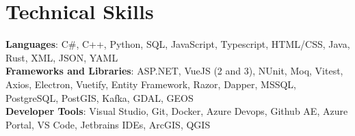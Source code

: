 \documentclass[letterpaper,11pt]{article}
\begin{document}
\section{Technical Skills}
\begin{itemize}[leftmargin=0.15in, label={}]
   \small{\item{
    \textbf{Languages}{: C\#, C++, Python, SQL, JavaScript, Typescript, HTML/CSS, Java, Rust, XML, JSON, YAML} \\
    \textbf{Frameworks and Libraries}{: ASP.NET, VueJS (2 and 3), NUnit, Moq, Vitest, Axios, Electron, Vuetify, Entity Framework, Razor, Dapper, MSSQL, PostgreSQL, PostGIS, Kafka, GDAL, GEOS} \\
    \textbf{Developer Tools}{: Visual Studio, Git, Docker, Azure Devops, Github AE, Azure Portal, VS Code, Jetbrains IDEs, ArcGIS, QGIS}
   }}
\end{itemize}


\end{document}
